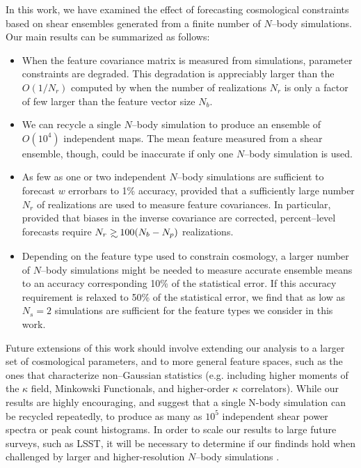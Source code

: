 \documentclass[reprint,aps,prd,superscriptaddress,showkeys,showpacs]{revtex4-1}
\newcommand\gsim{\mathrel{\rlap{\lower4pt\hbox{\hskip1pt$\sim$}}
        \raise1pt\hbox{$>$}}}
\begin{document}
In this work, we have examined the effect of forecasting cosmological
constraints based on shear ensembles generated from a finite number of
$N$--body simulations.  Our main results can be summarized as follows:
\vspace{0.4\baselineskip}
\begin{itemize}

\item When the feature covariance matrix is measured from simulations,
  parameter constraints are degraded. This degradation is appreciably
  larger than the $O(1/N_r)$ computed by \citep{DodelsonSchneider13}
  when the number of realizations $N_r$ is only a factor of few larger
  than the feature vector size $N_b$.
\item We can recycle a single $N$--body simulation to produce an
  ensemble of $O(10^4)$ independent maps. The mean feature measured
  from a shear ensemble, though, could be inaccurate if only one
  $N$--body simulation is used.
\item As few as one or two independent $N$--body simulations are
  sufficient to forecast $w$ errorbars to 1\% accuracy, provided that
  a sufficiently large number $N_r$ of realizations are used to
  measure feature covariances.  In particular, provided that biases
  in the inverse covariance are corrected, percent--level forecasts
  require $N_r\gsim 100 (N_b-N_p)$ realizations.
\item Depending on the feature type used to constrain cosmology, a
  larger number of $N$--body simulations might be needed to measure
  accurate ensemble means to an accuracy corresponding 10\% of the
  statistical error. If this accuracy requirement is relaxed to 50\%
  of the statistical error, we find that as low as $N_s=2$ simulations
  are sufficient for the feature types we consider in this work.
\end{itemize}
%
Future extensions of this work should involve extending our analysis
to a larger set of cosmological parameters, and to more general
feature spaces, such as the ones that characterize non--Gaussian
statistics (e.g. including higher moments of the $\kappa$ field,
Minkowski Functionals, and higher-order $\kappa$ correlators). While
our results are highly encouraging, and suggest that a single N-body
simulation can be recycled repeatedly, to produce as many as $10^5$
independent shear power spectra or peak count histograms. In order to
scale our results to large future surveys, such as LSST, it will be
necessary to determine if our findinds hold when challenged by larger
and higher-resolution $N$--body simulations \citep{Qcontinuum}.
\end{document}
